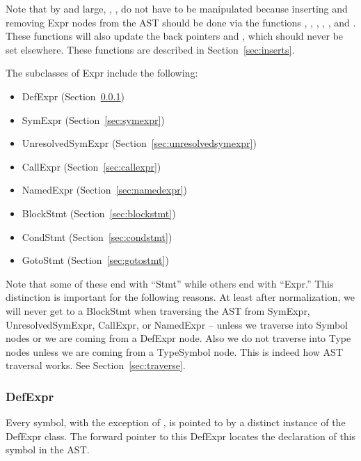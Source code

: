 \documentclass[10pt]{article}
\begin{document}
Note that by and large, , ,  do not have to
be manipulated because inserting and removing Expr nodes from the AST
should be done via the functions , ,
, , , and .
These functions will also update the back pointers  and
, which should never be set elsewhere.  These
functions are described in Section~\ref{sec:inserts}.

The subclasses of Expr include the following:
\begin{itemize}
\item DefExpr (Section~\ref{sec:defexpr})
\item SymExpr (Section~\ref{sec:symexpr})
\item UnresolvedSymExpr (Section~\ref{sec:unresolvedsymexpr})
\item CallExpr (Section~\ref{sec:callexpr})
\item NamedExpr (Section~\ref{sec:namedexpr})
\item BlockStmt (Section~\ref{sec:blockstmt})
\item CondStmt (Section~\ref{sec:condstmt})
\item GotoStmt (Section~\ref{sec:gotostmt})
\end{itemize}

Note that some of these end with ``Stmt'' while others end with
``Expr.''  This distinction is important for the following reasons.
At least after
normalization, we will never get to a BlockStmt when traversing the
AST from SymExpr, UnresolvedSymExpr, CallExpr, or NamedExpr --
unless we traverse into Symbol nodes or we are coming from a DefExpr
node. Also we do not traverse into Type nodes unless we are coming from
a TypeSymbol node.  This is indeed how AST traversal works.  See
Section~\ref{sec:traverse}.

\subsubsection{DefExpr}
\label{sec:defexpr}

Every symbol, with the exception of , is pointed to by
a distinct instance of the DefExpr class.  The forward pointer to this
DefExpr locates the declaration of this symbol in the AST.
\end{document}
